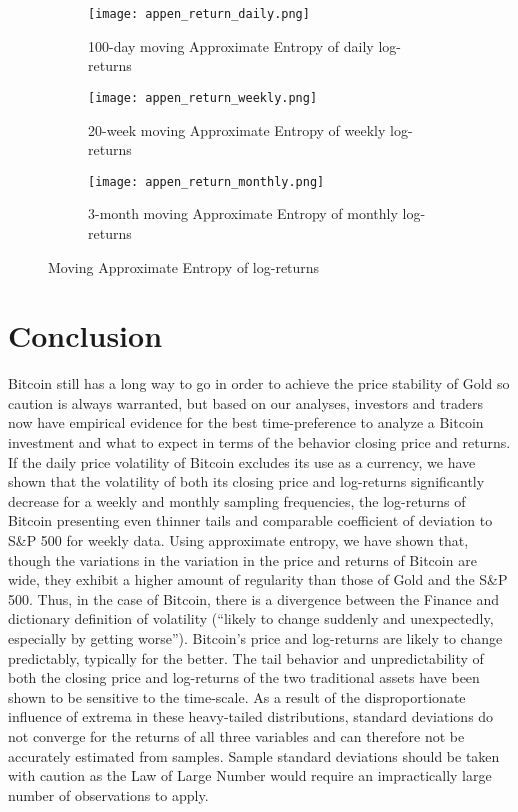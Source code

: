 \documentclass[12pt]{article}
\begin{document}
\begin{figure}[H]
\centering
\begin{subfigure}[b]{\textwidth}
\texttt{[image: appen\_return\_daily.png]}\hfill
\caption{100-day moving Approximate Entropy of daily log-returns}
\end{subfigure}
\begin{subfigure}[b]{\textwidth}
\texttt{[image: appen\_return\_weekly.png]}
\caption{20-week moving Approximate Entropy of weekly log-returns}
\end{subfigure}
\hfill
\begin{subfigure}[b]{\textwidth}
\texttt{[image: appen\_return\_monthly.png]}
\caption{3-month moving Approximate Entropy of monthly log-returns}
\end{subfigure}
\caption{Moving Approximate Entropy of log-returns}
\label{apenreturn}
\end{figure}
\section{Conclusion}
\label{conclusion}
Bitcoin still has a long way to go in order to achieve the price stability of Gold so caution is always warranted, but based on our analyses, investors and traders now have empirical evidence for the best time-preference to analyze a Bitcoin investment and what to expect in terms of the behavior closing price and returns. 
If the daily price volatility of Bitcoin excludes its use as a currency, we have shown that the volatility of both its closing price and log-returns significantly decrease for a weekly and monthly sampling frequencies, the log-returns of Bitcoin presenting even thinner tails and comparable coefficient of deviation to S\&P 500 for weekly data. Using approximate entropy, we have shown that, though the variations in the variation in the price and returns of Bitcoin are wide, they exhibit a higher amount of regularity than those of Gold and the S\&P 500. Thus, in the case of Bitcoin, there is a divergence between the Finance and dictionary definition of volatility (“likely to change suddenly and unexpectedly, especially by getting worse”). Bitcoin's price and log-returns are likely to change predictably, typically for the better. 
 The tail behavior and unpredictability of both the closing price and log-returns of the two traditional assets have been shown to be sensitive to the time-scale. As a result of the disproportionate influence of extrema in these heavy-tailed distributions, standard deviations do not converge for the returns of all three variables and can therefore not be accurately estimated from samples. Sample standard deviations should be taken with caution as the Law of Large Number would require an impractically large number of observations to apply. 
 
\end{document}
